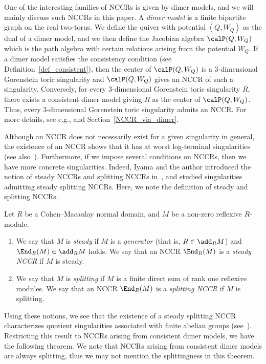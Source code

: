 One of the interesting families of NCCRs is given by dimer models, and we will mainly discuss such NCCRs in this paper. A \emph{dimer model} is a finite bipartite graph on the real two-torus. We define the quiver with potential $(Q, W_Q)$ as the dual of a dimer model, and we then define the Jacobian algebra $\calP(Q, W_Q)$ which is the path algebra with certain relations arising from the potential $W_Q$. If a dimer model satisfies the consistency condition (see Definition~\ref{def_consistent}), then the center of $\calP(Q, W_Q)$ is a $3$-dimensional Gorenstein toric singularity and $\calP(Q, W_Q)$ gives an NCCR of such a singularity. Conversely, for every $3$-dimensional Gorenstein toric singularity $R$, there exists a consistent dimer model giving $R$ as the center of $\calP(Q, W_Q)$. Thus, every $3$-dimensional Gorenstein toric singularity admits an NCCR. For more details, see e.g., \cite{Boc4,Bro,IU2} and Section~\ref{NCCR_via_dimer}.

Although an NCCR does not necessarily exist for a given singularity in general, the existence of an NCCR shows that it has at worst log-terminal singularities~\cite{DITW} (see also~\cite{DITV,StVdB}). Furthermore, if we impose several conditions on NCCRs, then we have more concrete singularities. Indeed, Iyama and the author introduced the notion of steady NCCRs and splitting NCCRs in~\cite{IN}, and studied singularities admitting steady splitting NCCRs. Here, we note the definition of steady and splitting NCCRs.

\begin{defi}\label{def_steady}
Let $R$ be a Cohen--Macaulay normal domain, and $M$ be a non-zero reflexive $R$-module.
\begin{enumerate}%
\item We say that $M$ is \emph{steady} if $M$ is a \emph{generator} (that is, $R\in\add_RM$) and $\End_R(M)\in\add_RM$ holds. We say that an NCCR $\End_R(M)$ is a \emph{steady NCCR} if $M$ is steady.
\item We say that $M$ is \emph{splitting} if $M$ is a finite direct sum of rank one reflexive modules. We say that an NCCR $\End_R(M)$ is a \emph{splitting NCCR} if $M$ is splitting.
\end{enumerate}
\end{defi}

Using these notions, we see that the existence of a steady splitting NCCR characterizes quotient singularities associated with finite abelian groups (see~\cite[Theorem~3.1]{IN}). Restricting this result to NCCRs arising from consistent dimer models, we have the following theorem. We note that NCCRs arising from consistent dimer models are always splitting, thus we may not mention the splittingness in this theorem.

